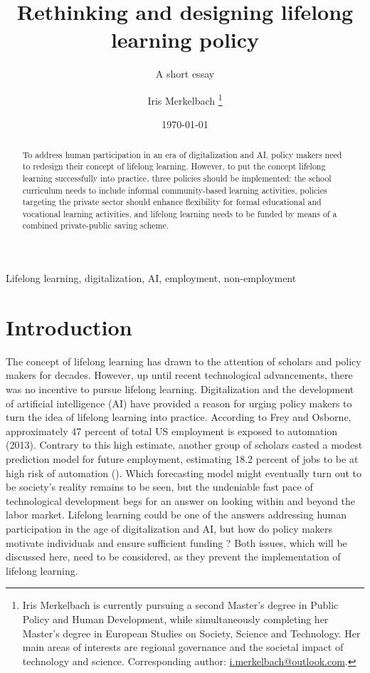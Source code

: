 \title{Rethinking and designing lifelong learning policy}
\subtitle{A short essay}
\author{Iris Merkelbach
\thanks{Iris Merkelbach is currently pursuing a second Master’s degree in Public Policy and Human Development, while simultaneously completing her Master’s degree in European Studies on Society, Science and Technology. Her main areas of interests are regional governance and the societal impact of technology and science. Corresponding author: \href{mailto:i.merkelbach@outlook.com}{i.merkelbach@outlook.com}.}  
}
\date{\today}
\maketitle
\begin{abstract}
    To address human participation in an era of digitalization and AI, policy makers need to redesign their concept of lifelong learning. However, to put the concept lifelong learning successfully into practice, three policies should be implemented: the school curriculum needs to include informal community-based learning activities, policies targeting the private sector should enhance flexibility for formal educational and vocational learning activities, and lifelong learning needs to be funded by means of a combined private-public saving scheme.
\end{abstract}
\begin{keywords}
    Lifelong learning, digitalization, AI, employment, non-employment
\end{keywords}

\section{Introduction}
The concept of lifelong learning has drawn to the attention of scholars and policy makers for decades. However, up until recent technological advancements, there was no incentive to pursue lifelong learning. Digitalization and the development of artificial intelligence (AI) have provided a reason for urging policy makers to turn the idea of lifelong learning into practice. According to Frey and Osborne, approximately 47 percent of total US employment is exposed to automation (2013). Contrary to this high estimate, another group of scholars casted a modest prediction model for future employment, estimating 18.2 percent of jobs to be at high risk of automation (\citealt{arntz2017revisiting}). Which forecasting model might eventually turn out to be society’s reality remains to be seen, but the undeniable fast pace of technological development begs for an answer on looking within and beyond the labor market. Lifelong learning could be one of the answers addressing human participation in the age of digitalization and AI, but how do policy makers motivate individuals and ensure sufficient funding ? Both issues, which will be discussed here, need to be considered, as they prevent the implementation of lifelong learning. 

